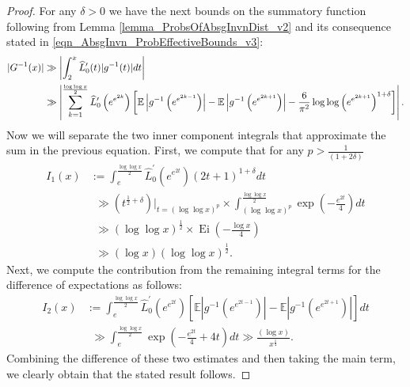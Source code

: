 \documentclass[11pt,reqno,a4letter]{article}
\numberwithin{figure}{section}
\numberwithin{table}{section}
\theoremstyle{plain}
\numberwithin{theorem}{section}
\theoremstyle{definition}
\begin{document}
\begin{proof}
For any $\delta > 0$ we have the next bounds on the summatory function 
following from Lemma \ref{lemma_ProbsOfAbsgInvnDist_v2} and its consequence stated in 
\eqref{eqn_AbsgInvn_ProbEffectiveBounds_v3}: 
\begin{align*} 
\notag 
|G^{-1}(x)| & \gg \left\lvert \int_2^x \widehat{L}_0^{\prime}(t) |g^{-1}(t)| dt \right\rvert \\ 
     & \gg \left\lvert \sum_{k=1}^{\frac{\log\log x}{2}} \widehat{L}_0^{\prime}\left(e^{e^{2k}}\right) \left[ 
     \mathbb{E}\left\lvert g^{-1}\left(e^{e^{2k-1}}\right) \right\rvert - 
     \mathbb{E}\left\lvert g^{-1}\left(e^{e^{2k+1}}\right) \right\rvert - 
     \frac{6}{\pi^2} \log\log\left(e^{e^{2k+1}}\right)^{1+\delta}  
     \right] \right\rvert. 
\end{align*} 
Now we will separate the two inner component integrals that approximate the 
sum in the previous equation. 
First, we compute that for any $p > \frac{1}{(1+2\delta)}$ 
\begin{align*} 
I_1(x) & := \int_{e}^{\frac{\log\log x}{2}} \widehat{L}_0^{\prime}\left(e^{e^{2t}}\right) 
     (2t+1)^{1+\delta} dt \\ 
     & \phantom{:} \gg \left(t^{\frac{1}{2}+\delta}\right) \Biggr\rvert_{t=(\log\log x)^{p}} \times 
     \int_{(\log\log x)^p}^{\frac{\log\log x}{2}} \exp\left(-\frac{e^{2t}}{4}\right) dt \\ 
     & \phantom{:} \gg (\log\log x)^{\frac{1}{2}} \times \operatorname{Ei}\left(-\frac{\log x}{4}\right) \\ 
     & \phantom{:} \gg (\log x) (\log\log x)^{\frac{1}{2}}. 
\end{align*} 
Next, we compute the contribution 
from the remaining integral terms for the difference of expectations as follows: 
\begin{align*} 
I_2(x) & := \int_{e}^{\frac{\log\log x}{2}} \widehat{L}_0^{\prime}\left(e^{e^{2t}}\right) \left[ 
     \mathbb{E}\left\lvert g^{-1}\left(e^{e^{2t-1}}\right) \right\rvert - 
     \mathbb{E}\left\lvert g^{-1}\left(e^{e^{2t+1}}\right) \right\rvert 
     \right] dt \\ 
     & \phantom{:} \gg 
     \int_{e}^{\frac{\log\log x}{2}} \exp\left(-\frac{e^{2t}}{4} + 4t\right) dt \gg 
     \frac{(\log x)}{x^{\frac{1}{4}}}. 
\end{align*} 
Combining the difference of these two estimates and then taking the main term, we clearly obtain that 
the stated result follows. 
\end{proof} 
\end{document}
